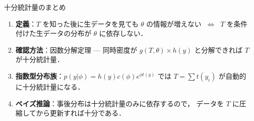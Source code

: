 \documentclass[lualatex,ja=standard,a4paper,12pt]{bxjsarticle}
\begin{document}
\begin{thmbox}{十分統計量のまとめ}
\begin{enumerate}
  \item \textbf{定義}：$T$ を知った後に生データを見ても $\theta$ の情報が増えない
        $\;\Leftrightarrow\;$ $T$ を条件付けた生データの分布が $\theta$ に依存しない．

  \item \textbf{確認方法}：因数分解定理 --- 同時密度が
        $g(T,\theta) \times h(y)$ と分解できれば $T$ が十分統計量．

  \item \textbf{指数型分布族}：$p(y|\phi) = h(y)c(\phi)e^{\phi t(y)}$ では
        $T = \sum t(y_i)$ が自動的に十分統計量になる．

  \item \textbf{ベイズ推論}：事後分布は十分統計量のみに依存するので，
        データを $T$ に圧縮してから更新すれば十分である．
\end{enumerate}
\end{thmbox}
\end{document}
